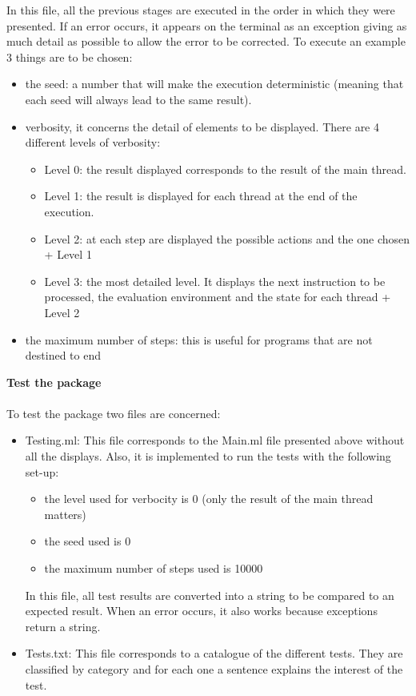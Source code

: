 \documentclass[11pt]{report}
\begin{document}
In this file, all the previous stages are executed in the order in which they were presented. If an error occurs, it appears on the terminal as an exception giving as much detail as possible to allow the error to be corrected. 
To execute an example 3 things are to be chosen:
\begin{itemize}
\item the seed: a number that will make the execution deterministic (meaning that each seed will always lead to the same result).
\item verbosity, it concerns the detail of elements to be displayed. There are 4 different levels of verbosity:
    \begin{itemize}
        \item Level 0: the result displayed corresponds to the result of the main thread. 
        \item Level 1: the result is displayed for each thread at the end of the execution. 
        \item Level 2: at each step are displayed the possible actions and the one chosen + Level 1
        \item Level 3: the most detailed level. It displays  the next instruction to be processed, the evaluation environment and the state for each thread + Level 2
        \end{itemize}
\item the maximum number of steps: this is useful for programs that are not destined to end
\end{itemize}


{}
\tabto{0cm} {\LARGE \textbf{Test the package}}
\\ \\
To test the package two files are concerned:
\begin{itemize}
\item Testing.ml: This file corresponds to the Main.ml file presented above without all the displays. Also, it is implemented to run the tests with the following set-up:
\begin{itemize}
    \item the level used for verbocity is 0 (only the result of the main thread matters)
    \item the seed used is 0
    \item the maximum number of steps used is 10000
\end{itemize}
In this file, all test results are converted into a string to be compared to an expected result. When an error occurs, it also works because exceptions return a string.
\item Tests.txt: This file corresponds to a catalogue of the different tests. They are classified by category and for each one a sentence explains the interest of the test.
\end{itemize}
\end{document}
